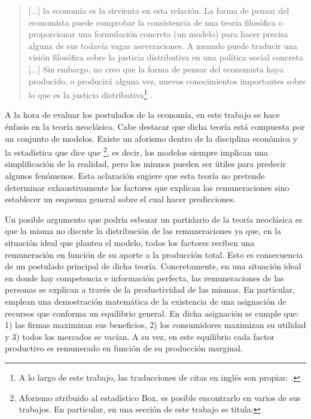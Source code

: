 \begin{quote}
    [...] la economía es la sirvienta en esta relación. La forma de pensar del economista puede comprobar la consistencia de una teoría filosófica o proporcionar una formulación concreta (un modelo) para hacer precisa alguna de sus todavía vagas aseveraciones. A menudo puede traducir una visión filosófica sobre la justicia distributiva en una política social concreta [...] Sin embargo, no creo que la forma de pensar del economista haya producido, o producirá alguna vez, nuevos conocimientos importantes sobre lo que es la justicia distributiva\footnote{A lo largo de este trabajo, las traducciones de citas en inglés son propias:  \citep[p. 3]{Roemer_1996a}.} \citep[p. 3]{Roemer_1996a}.
\end{quote}
\vspace{3mm}


A la hora de evaluar los postulados de la economía, en este trabajo se hace énfasis en la teoría neoclásica. Cabe destacar que dicha teoría está compuesta por un conjunto de modelos. Existe un aforismo dentro de la disciplina económica y la estadística que dice que \footnote{Aforismo atribuido al estadístico Box, es posible encontrarlo en varios de sus trabajos. En particular, en \citet[p. 202]{Box_1979} una sección de este trabajo se titula: }, es decir, los modelos siempre implican una simplificación de la realidad, pero los mismos pueden ser útiles para predecir algunos fenómenos. Esta aclaración sugiere que esta teoría no pretende determinar exhaustivamente los factores que explican las remuneraciones sino establecer un esquema general sobre el cual hacer predicciones. 

Un posible argumento que podría esbozar un partidario de la teoría neoclásica es que la misma no discute la distribución de las remuneraciones ya que, en la situación ideal que plantea el modelo, todos los factores reciben una remuneración en función de su aporte a la producción total. Esto es consecuencia de un postulado principal de dicha teoría. Concretamente, en una situación ideal en donde hay competencia e información perfecta, las remuneraciones de las personas se explican a través de la productividad de las mismas. En particular, \citet{Arrow_1954} emplean una demostración matemática de la existencia de una asignación de recursos que conforma un equilibrio general. En dicha asignación se cumple que: 1) las firmas maximizan sus beneficios, 2) los consumidores maximizan su utilidad y 3) todos los mercados se vacían. A su vez, en este equilibrio cada factor productivo es remunerado en función de su producción marginal.

